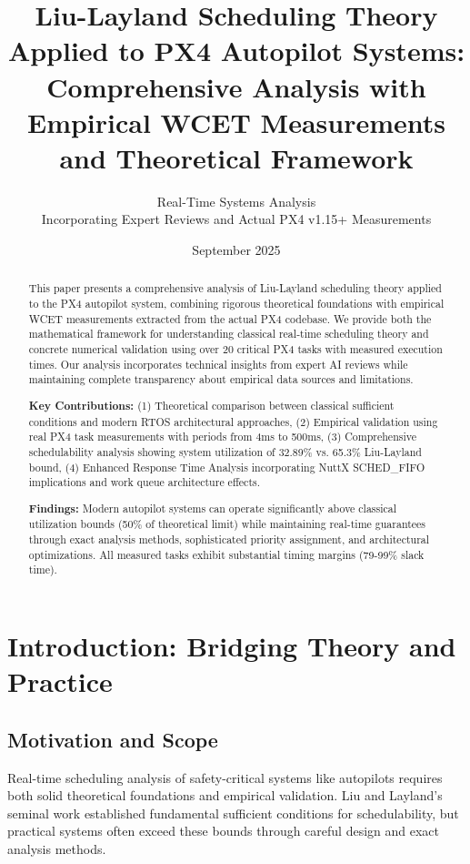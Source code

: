 \documentclass[12pt,a4paper]{article}
\title{Liu-Layland Scheduling Theory Applied to PX4 Autopilot Systems: \\
\large{Comprehensive Analysis with Empirical WCET Measurements and Theoretical Framework}}
\author{Real-Time Systems Analysis\\
\small{Incorporating Expert Reviews and Actual PX4 v1.15+ Measurements}}
\date{September 2025}
\begin{document}
\maketitle

\begin{abstract}
This paper presents a comprehensive analysis of Liu-Layland scheduling theory applied to the PX4 autopilot system, combining rigorous theoretical foundations with empirical WCET measurements extracted from the actual PX4 codebase. We provide both the mathematical framework for understanding classical real-time scheduling theory and concrete numerical validation using over 20 critical PX4 tasks with measured execution times. Our analysis incorporates technical insights from expert AI reviews while maintaining complete transparency about empirical data sources and limitations.

\textbf{Key Contributions:} (1) Theoretical comparison between classical sufficient conditions and modern RTOS architectural approaches, (2) Empirical validation using real PX4 task measurements with periods from 4ms to 500ms, (3) Comprehensive schedulability analysis showing system utilization of 32.89\% vs. 65.3\% Liu-Layland bound, (4) Enhanced Response Time Analysis incorporating NuttX SCHED\_FIFO implications and work queue architecture effects.

\textbf{Findings:} Modern autopilot systems can operate significantly above classical utilization bounds (50\% of theoretical limit) while maintaining real-time guarantees through exact analysis methods, sophisticated priority assignment, and architectural optimizations. All measured tasks exhibit substantial timing margins (79-99\% slack time).
\end{abstract}

\section{Introduction: Bridging Theory and Practice}

\subsection{Motivation and Scope}

Real-time scheduling analysis of safety-critical systems like autopilots requires both solid theoretical foundations and empirical validation. Liu and Layland's seminal work \cite{liu1973scheduling} established fundamental sufficient conditions for schedulability, but practical systems often exceed these bounds through careful design and exact analysis methods.
\end{document}
